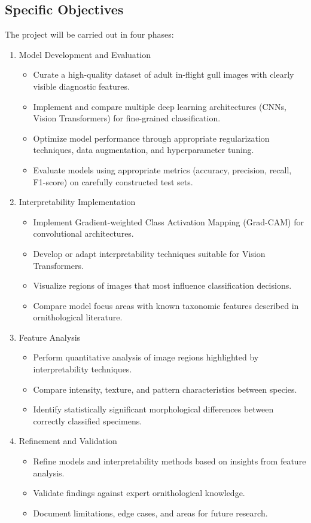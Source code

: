 \documentclass[a4paper,12pt]{article}
\begin{document}
\subsection*{Specific Objectives}
The project will be carried out in four phases:
\begin{enumerate}
    \item Model Development and Evaluation
        \begin{itemize}
            \item Curate a high-quality dataset of adult in-flight gull images with clearly visible diagnostic features.
            \item Implement and compare multiple deep learning architectures (CNNs, Vision Transformers) for fine-grained classification.
            \item Optimize model performance through appropriate regularization techniques, data augmentation, and hyperparameter tuning.
            \item Evaluate models using appropriate metrics (accuracy, precision, recall, F1-score) on carefully constructed test sets.
        \end{itemize}
    \item Interpretability Implementation
        \begin{itemize}
            \item Implement Gradient-weighted Class Activation Mapping (Grad-CAM) for convolutional architectures.
            \item Develop or adapt interpretability techniques suitable for Vision Transformers.
            \item Visualize regions of images that most influence classification decisions.
            \item Compare model focus areas with known taxonomic features described in ornithological literature.
        \end{itemize}
    \item Feature Analysis
        \begin{itemize}
            \item Perform quantitative analysis of image regions highlighted by interpretability techniques.
            \item Compare intensity, texture, and pattern characteristics between species.
            \item Identify statistically significant morphological differences between correctly classified specimens.
        \end{itemize}
    \item Refinement and Validation
        \begin{itemize}
            \item Refine models and interpretability methods based on insights from feature analysis.
            \item Validate findings against expert ornithological knowledge.
            \item Document limitations, edge cases, and areas for future research.
        \end{itemize}
\end{enumerate}
\end{document}
